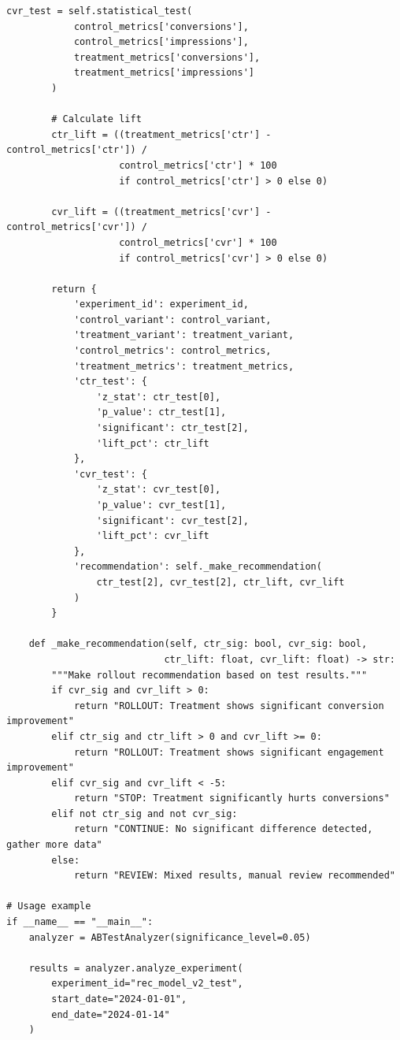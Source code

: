 \begin{lstlisting}[style=python, caption=A/B Test Analysis]
        cvr_test = self.statistical_test(
            control_metrics['conversions'],
            control_metrics['impressions'],
            treatment_metrics['conversions'],
            treatment_metrics['impressions']
        )

        # Calculate lift
        ctr_lift = ((treatment_metrics['ctr'] - control_metrics['ctr']) /
                    control_metrics['ctr'] * 100
                    if control_metrics['ctr'] > 0 else 0)

        cvr_lift = ((treatment_metrics['cvr'] - control_metrics['cvr']) /
                    control_metrics['cvr'] * 100
                    if control_metrics['cvr'] > 0 else 0)

        return {
            'experiment_id': experiment_id,
            'control_variant': control_variant,
            'treatment_variant': treatment_variant,
            'control_metrics': control_metrics,
            'treatment_metrics': treatment_metrics,
            'ctr_test': {
                'z_stat': ctr_test[0],
                'p_value': ctr_test[1],
                'significant': ctr_test[2],
                'lift_pct': ctr_lift
            },
            'cvr_test': {
                'z_stat': cvr_test[0],
                'p_value': cvr_test[1],
                'significant': cvr_test[2],
                'lift_pct': cvr_lift
            },
            'recommendation': self._make_recommendation(
                ctr_test[2], cvr_test[2], ctr_lift, cvr_lift
            )
        }

    def _make_recommendation(self, ctr_sig: bool, cvr_sig: bool,
                            ctr_lift: float, cvr_lift: float) -> str:
        """Make rollout recommendation based on test results."""
        if cvr_sig and cvr_lift > 0:
            return "ROLLOUT: Treatment shows significant conversion improvement"
        elif ctr_sig and ctr_lift > 0 and cvr_lift >= 0:
            return "ROLLOUT: Treatment shows significant engagement improvement"
        elif cvr_sig and cvr_lift < -5:
            return "STOP: Treatment significantly hurts conversions"
        elif not ctr_sig and not cvr_sig:
            return "CONTINUE: No significant difference detected, gather more data"
        else:
            return "REVIEW: Mixed results, manual review recommended"

# Usage example
if __name__ == "__main__":
    analyzer = ABTestAnalyzer(significance_level=0.05)

    results = analyzer.analyze_experiment(
        experiment_id="rec_model_v2_test",
        start_date="2024-01-01",
        end_date="2024-01-14"
    )


\end{lstlisting}
